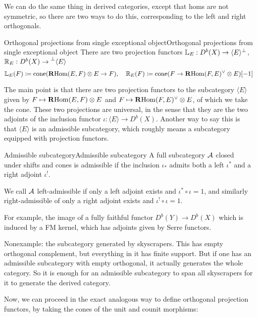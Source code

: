 We can do the same thing in derived categories, except that homs are not symmetric, so there are two ways to do this, corresponding to the left and right orthogonals.

\begin{definition}{Orthogonal projections from single exceptional object}{Orthogonal projections from single exceptional object}
    There are two projection functors $\mathbb{L}_E:D^b(X)\to\langle E\rangle ^\perp$, $\mathbb{R}_E:D^b(X)\to\prescript{\perp}{}{\langle} E\rangle$
    \begin{equation*}
        \mathbb{L}_E(F) \coloneqq \operatorname{cone}(\operatorname{\mathbf{R} Hom}(E,F)\otimes E \to F), \quad
        \mathbb{R}_E(F) \coloneqq \operatorname{cone}(F\to\operatorname{\mathbf{R} Hom}(F,E)^\lor\otimes E )[-1]
    \end{equation*}
\end{definition}

The main point is that there are two projection functors to the subcategory $\langle E \rangle$ given by $F\mapsto\operatorname{\mathbf{R} Hom}(E,F)\otimes E$ and $F\mapsto\operatorname{\mathbf{R} Hom}(F,E)^\lor\otimes E$, of which we take the cone. These two projections are universal, in the sense that they are the two adjoints of the inclusion functor $\iota:\langle E \rangle \to D^b(X)$. Another way to say this is that $\langle E \rangle$ is an admissible subcategory, which roughly means a subcategory equipped with projection functors.

\begin{definition}{Admissible subcategory}{Admissible subcategory}
    A full subcategory $\mathcal{A}$ closed under shifts and cones is admissible if the inclusion $\iota_*$ admits both a left $\iota^*$ and a right adjoint $\iota^!$.

    We call $\mathcal{A}$ left-admissible if only a left adjoint exists and $\iota^*\circ \iota=1$, and similarly right-admissible of only a right adjoint exists and $\iota^! \circ \iota=1$.
\end{definition}

For example, the image of a fully faithful functor $D^b(Y)\to D^b(X)$ which is induced by a FM kernel, which has adjoints given by Serre functors.

Nonexample: the subcategory generated by skyscrapers. This has empty orthogonal complement, but everything in it has finite support. But if one has an admissible subcategory with empty orthogonal, it actually generates the whole category. So it is enough for an admissible subcategory to span all skyscrapers for it to generate the derived category.

Now, we can proceed in the exact analogous way to define orthogonal projection functors, by taking the cones of the unit and counit morphisms:

